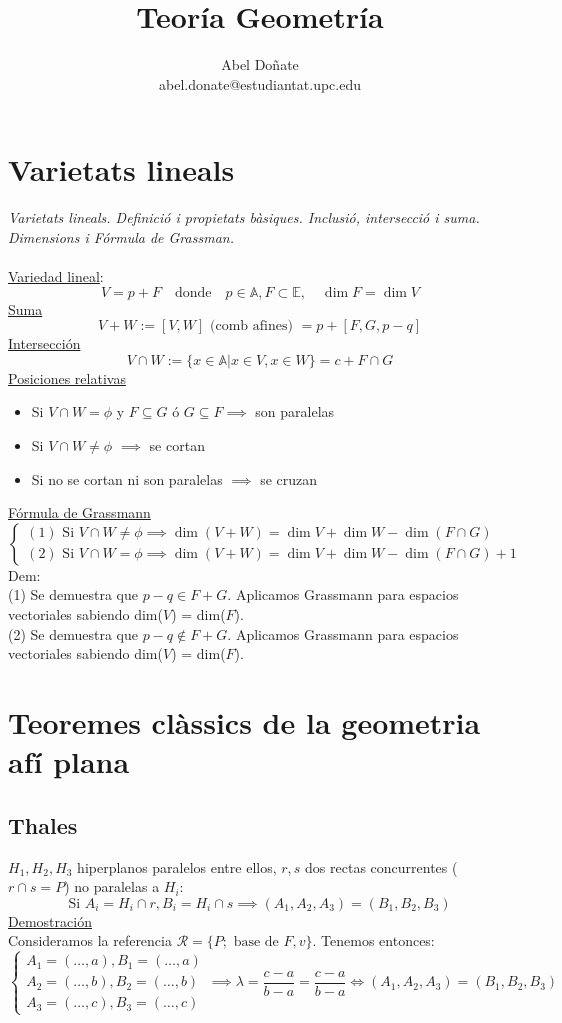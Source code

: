 \documentclass{article}
\title{Teoría Geometría}
\author{Abel Doñate \\ abel.donate@estudiantat.upc.edu}
\date{}
\newcommand{\A}{\mathbb{A}}
\newcommand{\E}{\mathbb{E}}
\newcommand{\h}{\hspace{1em}}
\renewcommand{\t}[1]{\text{#1}}
\begin{document}
\maketitle

\section{Varietats lineals}
\textit{Varietats lineals. Definició i propietats bàsiques. Inclusió, intersecció i suma. Dimensions i Fórmula de Grassman.} \\
\\
\underline{Variedad lineal}:
\[V = p + F \h \t{donde} \h p\in \A, F\subset \E, \h \dim F = \dim V\]
\underline{Suma}
\[V+W:=[V, W] \t{ (comb afines) } =p + [F, G, p-q]\]
\underline{Intersección}
\[V\cap W := \{x\in \A | x\in V, x\in W\} = c + F\cap G\]
\underline{Posiciones relativas}
\begin{itemize}
    \item Si $V\cap W = \phi$ y $F\subseteq G$ ó $G\subseteq F \implies$ son paralelas
    \item Si $V\cap W \neq \phi$ $\implies$ se cortan
    \item Si no se cortan ni son paralelas $\implies$ se cruzan
\end{itemize}
\underline{Fórmula de Grassmann} \\
\[
\begin{cases}
    (1) \t{ Si } V\cap W \neq \phi \implies \dim(V+W) = \dim V + \dim W -\dim(F\cap G) \\
    (2)\t{ Si } V\cap W = \phi \implies \dim(V+W) = \dim V + \dim W -\dim(F\cap G) + 1
\end{cases}
\]
Dem: \\
(1) Se demuestra que $p-q\in F+G$. Aplicamos Grassmann para espacios vectoriales sabiendo dim($V$) = dim($F$). \\
(2) Se demuestra que $p-q\notin F+G$. Aplicamos Grassmann para espacios vectoriales sabiendo dim($V$) = dim($F$). \\


\section{Teoremes clàssics de la geometria afí plana}
\subsection{Thales}
$H_1, H_2, H_3$ hiperplanos paralelos entre ellos, $r, s$ dos rectas concurrentes ($r\cap s = P$) no paralelas a $H_i$:
\[\t{Si } A_i = H_i\cap r, B_i = H_i\cap s \implies (A_1, A_2, A_3) = (B_1, B_2, B_3)\]
\underline{Demostración} \\
Consideramos la referencia $\mathcal{R} = \{P; \t{ base de } F, v\}$. Tenemos entonces:
\[\begin{cases}
    A_1 = (\ldots, a), B_1 = (\ldots, a) \\
    A_2 = (\ldots, b), B_2 = (\ldots, b) \\
    A_3 = (\ldots, c), B_3 = (\ldots, c)
\end{cases} \implies \lambda = \frac{c-a}{b-a} = \frac{c-a}{b-a} \iff (A_1, A_2, A_3) = (B_1, B_2, B_3)\]
\end{document}
